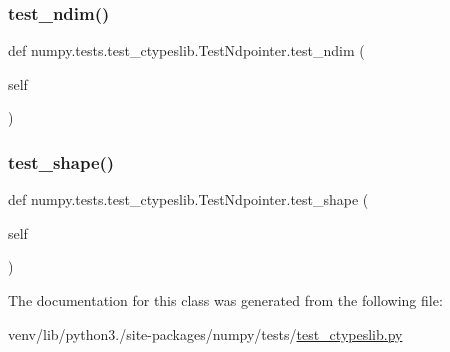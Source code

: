 \subsubsection{\texorpdfstring{test\+\_\+ndim()}{test\_ndim()}}
{\footnotesize\ttfamily def numpy.\+tests.\+test\+\_\+ctypeslib.\+Test\+Ndpointer.\+test\+\_\+ndim (\begin{DoxyParamCaption}\item[{}]{self }\end{DoxyParamCaption})}

\mbox{\label{classnumpy_1_1tests_1_1test__ctypeslib_1_1TestNdpointer_a1e7ece877caab0b954da32e61e6d1b67}} 
\subsubsection{\texorpdfstring{test\+\_\+shape()}{test\_shape()}}
{\footnotesize\ttfamily def numpy.\+tests.\+test\+\_\+ctypeslib.\+Test\+Ndpointer.\+test\+\_\+shape (\begin{DoxyParamCaption}\item[{}]{self }\end{DoxyParamCaption})}



The documentation for this class was generated from the following file\+:\begin{DoxyCompactItemize}
\item 
venv/lib/python3./site-\/packages/numpy/tests/\hyperlink{test__ctypeslib_8py}{test\+\_\+ctypeslib.\+py}\end{DoxyCompactItemize}
